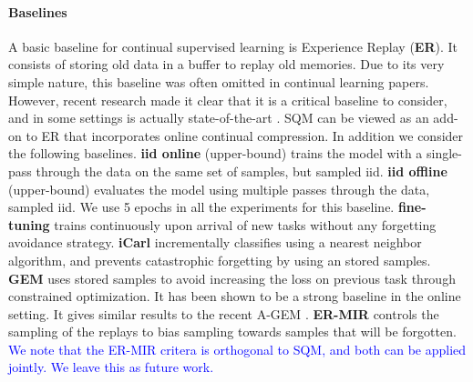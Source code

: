 \documentclass[colorinlistoftodos]{article} %
\newcommand\mynotesLC[1]{\textcolor{blue}{#1}}
\begin{document}
\paragraph{Baselines}
A basic baseline for continual supervised learning is Experience Replay (\textbf{ER}). It consists of storing old data in a buffer to replay old memories. Due to its very simple nature, this baseline was often omitted in continual learning papers. However, recent research made it clear that it is a critical baseline to consider, and in some settings is actually state-of-the-art \citep{chaudhry2019continual,aljundi2019online,rolnick2018experience}. SQM can be viewed as an add-on to ER that incorporates online continual compression. In addition we consider the following baselines. \textbf{iid online} (upper-bound)
 trains the model with a single-pass through the data on the same set of samples, but sampled iid. \textbf{iid offline} (upper-bound) evaluates the model using multiple passes through the data, sampled iid. We use 5 epochs in all the experiments for this baseline. \textbf{fine-tuning} trains continuously upon arrival of new tasks without any forgetting avoidance strategy. \textbf{iCarl} \citep{rebuffi2017icarl} incrementally classifies using a nearest neighbor algorithm, and prevents catastrophic forgetting by using an stored samples. \textbf{GEM} \citep{lopez2017gradient} uses stored samples to avoid increasing the loss on previous task through constrained optimization. It has been shown to be a strong baseline in the online setting. It gives similar results to the recent A-GEM \cite{chaudhry2018efficient}. \textbf{ER-MIR} \citep{aljundi2019online} controls the sampling of the replays to bias sampling towards samples that will be forgotten. \mynotesLC{We note that the ER-MIR critera is orthogonal to SQM, and both can be applied jointly. We leave this as future work.}
\end{document}
